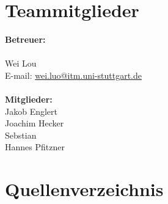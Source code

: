 \documentclass[ngerman]{article}
\begin{document}
\tableofcontents
\newpage
\section{Teammitglieder}
\textbf {Betreuer:}\\
\\
 Wei Lou\\
\hfill  E-mail: \href{wei.luo@itm.uni-stuttgart.de}{wei.luo@itm.uni-stuttgart.de}\\
\\
\textbf {Mitglieder:}\\
Jakob Englert\\
Joachim Hecker\\
Sebstian\\
Hannes Pfitzner\\








\section{Quellenverzeichnis}
\end{document}
